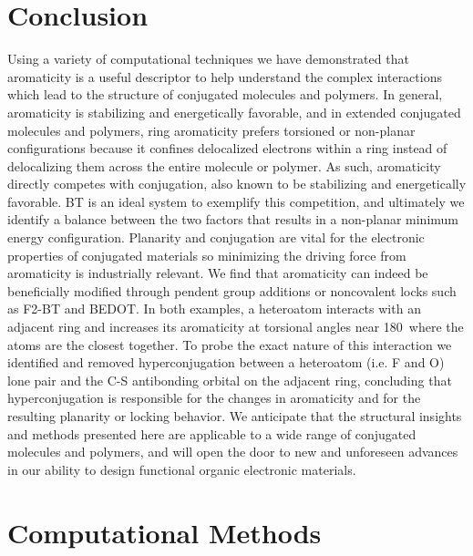 \section{Conclusion}

Using a variety of computational techniques we have demonstrated that aromaticity is a useful descriptor to help understand the complex interactions which lead to the structure of conjugated molecules and polymers. In general, aromaticity is stabilizing and energetically favorable, and in extended conjugated molecules and polymers, ring aromaticity prefers torsioned or non-planar configurations because it confines delocalized electrons within a ring instead of delocalizing them across the entire molecule or polymer. As such, aromaticity directly competes with conjugation, also known to be stabilizing and energetically favorable. BT is an ideal system to exemplify this competition, and ultimately we identify a balance between the two factors that results in a non-planar minimum energy configuration. Planarity and conjugation are vital for the electronic properties of conjugated materials so minimizing the driving force from aromaticity is industrially relevant. We find that aromaticity can indeed be beneficially modified through pendent group additions or noncovalent locks such as F2-BT and BEDOT. In both examples, a heteroatom interacts with an adjacent ring and increases its aromaticity at torsional angles near 180\textdegree \ where the atoms are the closest together. To probe the exact nature of this interaction we identified and removed hyperconjugation between a heteroatom (i.e. F and O) lone pair and the C-S antibonding orbital on the adjacent ring, concluding that hyperconjugation is responsible for the changes in aromaticity and for the resulting planarity or locking behavior. We anticipate that the structural insights and methods presented here are applicable to a wide range of conjugated molecules and polymers, and will open the door to new and unforeseen advances in our ability to design functional organic electronic materials.

\section{Computational Methods}

